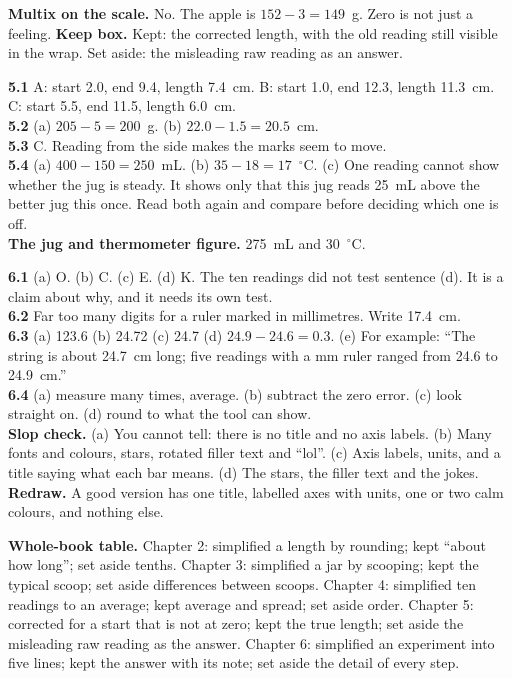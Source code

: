 \textbf{Multix on the scale.} No. The apple is $152-3=149$~g. Zero is not just a feeling. \textbf{Keep box.} Kept: the corrected length, with the old reading still visible in the wrap. Set aside: the misleading raw reading as an answer.

\textbf{5.1} A: start 2.0, end 9.4, length 7.4~cm. B: start 1.0, end 12.3, length 11.3~cm. C: start 5.5, end 11.5, length 6.0~cm.\\
\textbf{5.2} (a) $205-5=200$~g. (b) $22.0-1.5=20.5$~cm.\\
\textbf{5.3} C. Reading from the side makes the marks seem to move.\\
\textbf{5.4} (a) $400-150=250$~mL. (b) $35-18=17$~$^\circ$C. (c) One reading cannot show whether the jug is steady. It shows only that this jug reads 25~mL above the better jug this once. Read both again and compare before deciding which one is off.\\
\textbf{The jug and thermometer figure.} 275~mL and 30~$^\circ$C.

\textbf{6.1} (a) O. (b) C. (c) E. (d) K. The ten readings did not test sentence (d). It is a claim about why, and it needs its own test.\\
\textbf{6.2} Far too many digits for a ruler marked in millimetres. Write 17.4~cm.\\
\textbf{6.3} (a) 123.6 (b) 24.72 (c) 24.7 (d) $24.9-24.6=0.3$. (e) For example: ``The string is about 24.7~cm long; five readings with a mm ruler ranged from 24.6 to 24.9~cm.''\\
\textbf{6.4} (a) measure many times, average. (b) subtract the zero error. (c) look straight on. (d) round to what the tool can show.\\
\textbf{Slop check.} (a) You cannot tell: there is no title and no axis labels. (b) Many fonts and colours, stars, rotated filler text and ``lol''. (c) Axis labels, units, and a title saying what each bar means. (d) The stars, the filler text and the jokes.\\
\textbf{Redraw.} A good version has one title, labelled axes with units, one or two calm colours, and nothing else.

\textbf{Whole-book table.} Chapter 2: simplified a length by rounding; kept ``about how long''; set aside tenths. Chapter 3: simplified a jar by scooping; kept the typical scoop; set aside differences between scoops. Chapter 4: simplified ten readings to an average; kept average and spread; set aside order. Chapter 5: corrected for a start that is not at zero; kept the true length; set aside the misleading raw reading as the answer. Chapter 6: simplified an experiment into five lines; kept the answer with its note; set aside the detail of every step.


